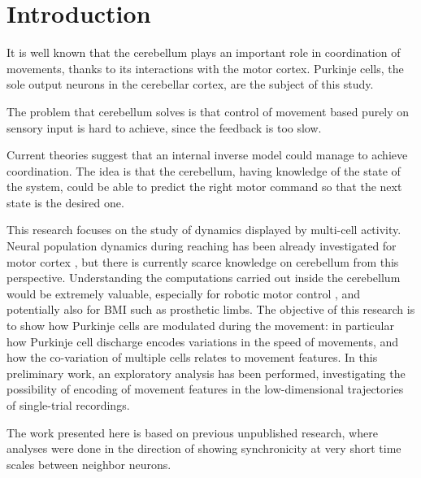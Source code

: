\section{Introduction}

It is well known that the cerebellum plays an important role in coordination of movements, thanks to its interactions with the motor cortex. Purkinje cells, the sole output neurons in the cerebellar cortex, are the subject of this study. 

The problem that cerebellum solves is that control of movement based purely on sensory input is hard to achieve, since the feedback is too slow.

Current theories suggest that an internal inverse model \cite{wolpert1998internal} could manage to achieve coordination. The idea is that the cerebellum, having knowledge of the state of the system, could be able to predict the right motor command so that the next state is the desired one.

This research focuses on the study of dynamics displayed by multi-cell activity. Neural population dynamics during reaching has been already investigated for motor cortex \cite{churchland2012neural}, but there is currently scarce knowledge on cerebellum from this perspective.
Understanding the computations carried out inside the cerebellum would be extremely valuable, especially for robotic motor control \cite{casellato2014adaptive}, and potentially also for BMI such as prosthetic limbs. 
The objective of this research is to show how Purkinje cells are modulated during the movement: in particular how Purkinje cell discharge encodes variations in the speed of movements, and how the co-variation of multiple cells relates to movement features.
In this preliminary work, an exploratory analysis has been performed, investigating the possibility of encoding of movement features in the low-dimensional trajectories of single-trial recordings.

The work presented here is based on previous unpublished research, where analyses were done in the direction of showing synchronicity at very short time scales between neighbor neurons. 
